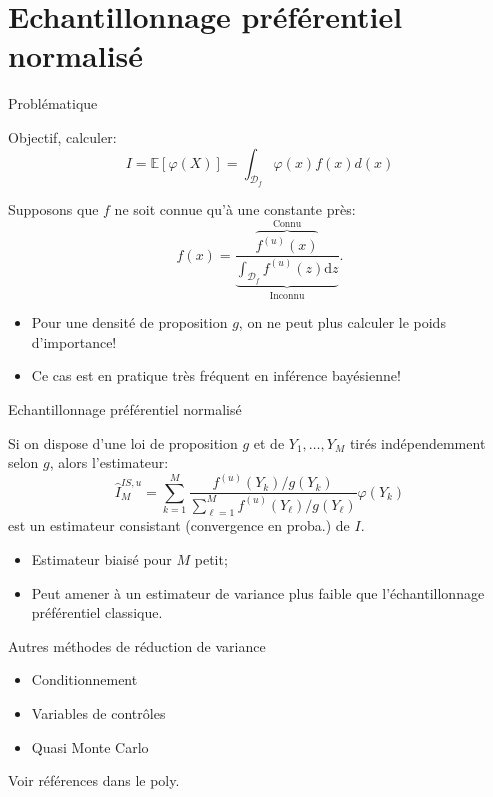 \documentclass[ignorenonframetext,]{beamer}
\providecommand{\tightlist}{%
  \setlength{\itemsep}{0pt}\setlength{\parskip}{0pt}}
\newcommand{\rmd}{\text{d}}
\begin{document}
\hypertarget{echantillonnage-pruxe9fuxe9rentiel-normalisuxe9}{%
\section{Echantillonnage préférentiel
normalisé}\label{echantillonnage-pruxe9fuxe9rentiel-normalisuxe9}}

\begin{frame}{Problématique}
\protect\hypertarget{probluxe9matique}{}

Objectif, calculer:
\[I = \mathbb{E}[\varphi(X)] = \int_{\mathcal{D}_f} \varphi(x) f(x) d(x)\]

Supposons que \(f\) ne soit connue qu'à une constante près:
\[f(x) = \frac{\overbrace{f^{(u)}(x)}^{\text{Connu}}}{\underbrace{\int_{\mathcal{D}_f} f^{(u)}(z)\rmd z}_\text{Inconnu}}.\]

\begin{itemize}
\item
  Pour une densité de proposition \(g\), on ne peut plus calculer le
  poids d'importance!\pause
\item
  Ce cas est en pratique très fréquent en inférence bayésienne!
\end{itemize}

\end{frame}

\begin{frame}{Echantillonnage préférentiel normalisé}
\protect\hypertarget{echantillonnage-pruxe9fuxe9rentiel-normalisuxe9-1}{}

Si on dispose d'une loi de proposition \(g\) et de \(Y_1,\dots, Y_M\)
tirés indépendemment selon \(g\), alors l'estimateur:
\[\hat{I}^{IS,u}_M = \sum_{k = 1}^M  \frac{f^{(u)}(Y_k)/g(Y_k)}{\sum_{\ell = 1}^M f^{(u)}(Y_\ell) / g(Y_\ell)}\varphi(Y_k)\]
est un estimateur consistant (convergence en proba.) de \(I\).\pause

\begin{itemize}
\tightlist
\item
  Estimateur biaisé pour \(M\) petit;
\item
  Peut amener à un estimateur de variance plus faible que
  l'échantillonnage préférentiel classique.
\end{itemize}

\end{frame}

\begin{frame}{Autres méthodes de réduction de variance}
\protect\hypertarget{autres-muxe9thodes-de-ruxe9duction-de-variance}{}

\begin{itemize}
\tightlist
\item
  Conditionnement
\item
  Variables de contrôles
\item
  Quasi Monte Carlo
\end{itemize}

Voir références dans le poly.

\end{frame}
\end{document}
